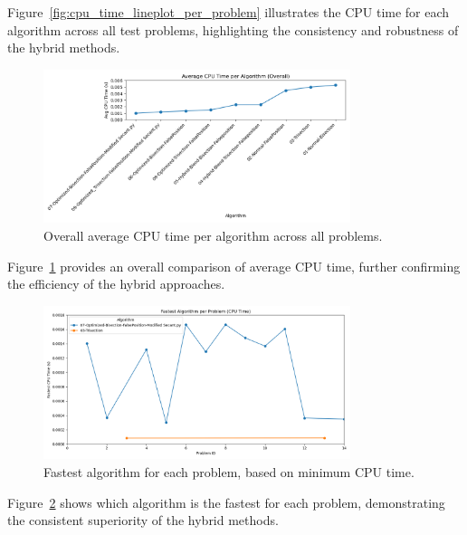 \documentclass[amsmath, amssymb, aps]{revtex4-2}
\begin{document}
Figure~\ref{fig:cpu_time_lineplot_per_problem} illustrates the CPU time for each algorithm across all test problems, highlighting the consistency and robustness of the hybrid methods.

\begin{figure}[H]
    \centering
    \includegraphics[width=0.8\textwidth]{avg_cpu_time_lineplot_overall.png}
    \caption{Overall average CPU time per algorithm across all problems.}
    \label{fig:avg_cpu_time_lineplot_overall}
\end{figure}

Figure~\ref{fig:avg_cpu_time_lineplot_overall} provides an overall comparison of average CPU time, further confirming the efficiency of the hybrid approaches.

\begin{figure}[H]
    \centering
    \includegraphics[width=0.8\textwidth]{fastest_algorithm_per_problem_lineplot.png}
    \caption{Fastest algorithm for each problem, based on minimum CPU time.}
    \label{fig:fastest_algorithm_per_problem}
\end{figure}

Figure~\ref{fig:fastest_algorithm_per_problem} shows which algorithm is the fastest for each problem, demonstrating the consistent superiority of the hybrid methods.
\end{document}
